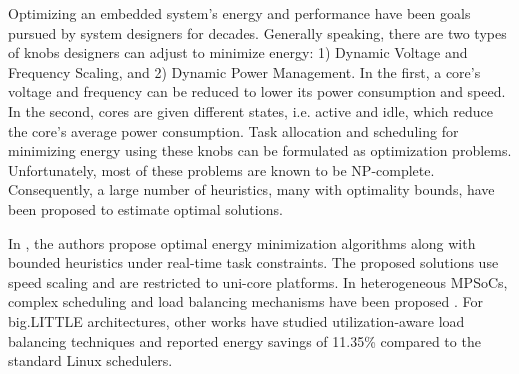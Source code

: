 Optimizing an embedded system's energy and performance have been goals pursued by system designers for decades. Generally speaking, there are two types of knobs designers can adjust to minimize energy: 1) Dynamic Voltage and Frequency Scaling, and 2) Dynamic Power Management. In the first, a core's voltage and frequency can be reduced to lower its power consumption and speed. In the second, cores are given different states, i.e. active and idle, which reduce the core's average power consumption. Task allocation and scheduling for minimizing energy using these knobs can be formulated as optimization problems. Unfortunately, most of these problems are known to be NP-complete. Consequently, a large number of heuristics, many with optimality bounds, have been proposed to estimate optimal solutions.

In \cite{YDS, Aydin2001, Chen2007}, the authors propose optimal energy minimization algorithms along with bounded heuristics under real-time task constraints. The proposed solutions use speed scaling and are restricted to uni-core platforms. In heterogeneous MPSoCs, complex scheduling and load balancing mechanisms have been proposed \cite{Sarma2015}. For big.LITTLE architectures, other works \cite{Kim2014} have studied utilization-aware load balancing techniques and reported energy savings of 11.35\% compared to the standard Linux schedulers. 


